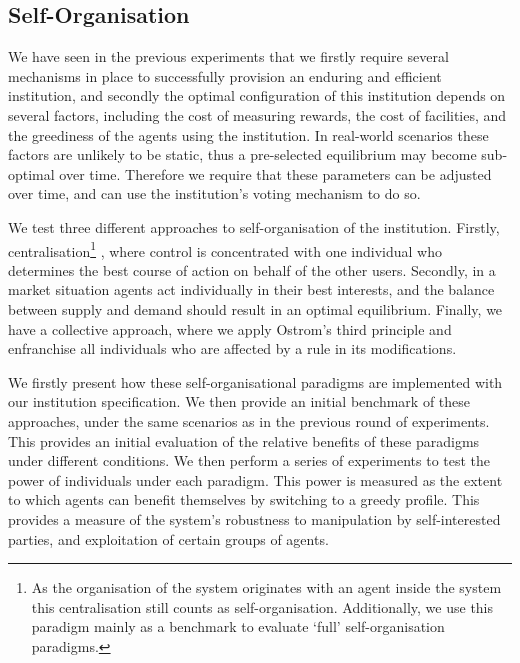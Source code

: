 

\subsection{Self-Organisation}

We have seen in the previous experiments that we firstly require several
mechanisms in place to successfully provision an enduring and efficient
institution, and secondly the optimal configuration of this institution
depends on several factors, including the cost of measuring rewards, the cost
of facilities, and the greediness of the agents using the institution.
In real-world scenarios these factors are unlikely to be static, thus a 
pre-selected equilibrium may become sub-optimal over time. Therefore we require
that these parameters can be adjusted over time, and can use the institution's
voting mechanism to do so.

We test three different approaches to self-organisation of the institution.
Firstly, centralisation\footnote{As the organisation of the system originates with an agent inside the system this centralisation still counts as self-organisation. Additionally, we use this paradigm mainly as a benchmark to evaluate `full' self-organisation paradigms.}
, where control is concentrated with one individual who
determines the best course of action on behalf of the other users. Secondly,
in a market situation agents act individually in their best interests, and the
balance between supply and demand should result in an optimal equilibrium.
Finally, we have a collective approach, where we apply Ostrom's third principle and enfranchise all individuals who
are affected by a rule in its modifications.

We firstly present how these self-organisational paradigms are implemented
with our institution specification. We then provide an initial benchmark of
these approaches, under the same scenarios as in the previous round of
experiments. This provides an initial evaluation of the relative benefits of
these paradigms under different conditions. We then perform a series of
experiments to test the power of individuals under each paradigm. This power
is measured as the extent to which agents can benefit themselves by switching
to a greedy profile. This provides a measure of the system's robustness to
manipulation by self-interested parties, and exploitation of certain groups of
agents.

